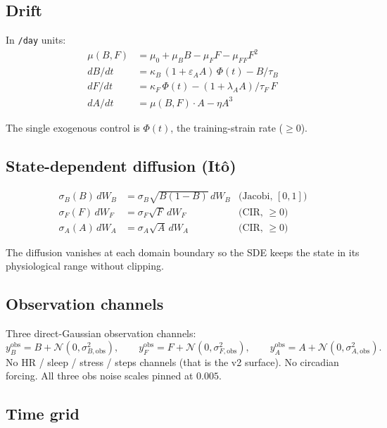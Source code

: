 \documentclass[11pt,a4paper]{article}
\begin{document}
\subsection{Drift}

In \texttt{/day} units:
\begin{align}
  \mu(B, F)        &= \mu_0 + \mu_B B - \mu_F F - \mu_{FF} F^2 \\
  dB/dt            &= \kappa_B \, (1 + \varepsilon_A A) \, \Phi(t) - B / \tau_B \\
  dF/dt            &= \kappa_F \, \Phi(t) - (1 + \lambda_A A) / \tau_F \, F \\
  dA/dt            &= \mu(B, F) \cdot A - \eta A^3
\end{align}

The single exogenous control is $\Phi(t)$, the training-strain rate
($\geq 0$).

\subsection{State-dependent diffusion (It\^o)}

\begin{align}
  \sigma_B(B) \, dW_B &= \sigma_B \sqrt{B(1-B)} \, dW_B  & \text{(Jacobi, $[0,1]$)} \\
  \sigma_F(F) \, dW_F &= \sigma_F \sqrt{F} \, dW_F        & \text{(CIR, $\geq 0$)} \\
  \sigma_A(A) \, dW_A &= \sigma_A \sqrt{A} \, dW_A        & \text{(CIR, $\geq 0$)}
\end{align}

The diffusion vanishes at each domain boundary so the SDE keeps the
state in its physiological range without clipping.

\subsection{Observation channels}

Three direct-Gaussian observation channels:
\begin{equation}
  y^{\mathrm{obs}}_B = B + \mathcal{N}(0, \sigma_{B,\mathrm{obs}}^2),
  \qquad
  y^{\mathrm{obs}}_F = F + \mathcal{N}(0, \sigma_{F,\mathrm{obs}}^2),
  \qquad
  y^{\mathrm{obs}}_A = A + \mathcal{N}(0, \sigma_{A,\mathrm{obs}}^2).
\end{equation}
No HR / sleep / stress / steps channels (that is the v2 surface). No
circadian forcing. All three obs noise scales pinned at $0.005$.

\subsection{Time grid}
\end{document}
